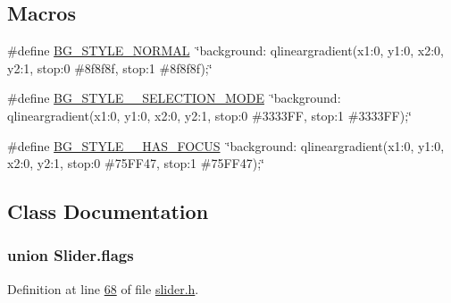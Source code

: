 \subsection*{Macros}
\begin{DoxyCompactItemize}
\item 
\#define \hyperlink{a00025_a0a9d6eabafd981a8b48b343249428077}{B\+G\+\_\+\+S\+T\+Y\+L\+E\+\_\+\+N\+O\+R\+M\+A\+L}~\char`\"{}background\+: qlineargradient(x1\+:0, y1\+:0, x2\+:0, y2\+:1, stop\+:0 \#8f8f8f, stop\+:1 \#8f8f8f);\char`\"{}
\item 
\#define \hyperlink{a00025_a0d978e946366d0eb299bb966cf8a52e9}{B\+G\+\_\+\+S\+T\+Y\+L\+E\+\_\+\+\_\+\+S\+E\+L\+E\+C\+T\+I\+O\+N\+\_\+\+M\+O\+D\+E}~\char`\"{}background\+: qlineargradient(x1\+:0, y1\+:0, x2\+:0, y2\+:1, stop\+:0 \#3333\+F\+F, stop\+:1 \#3333\+F\+F);\char`\"{}
\item 
\#define \hyperlink{a00025_a3b78c22b908aee9d7cda0ff6240570fd}{B\+G\+\_\+\+S\+T\+Y\+L\+E\+\_\+\+\_\+\+H\+A\+S\+\_\+\+F\+O\+C\+U\+S}~\char`\"{}background\+: qlineargradient(x1\+:0, y1\+:0, x2\+:0, y2\+:1, stop\+:0 \#75\+F\+F47, stop\+:1 \#75\+F\+F47);\char`\"{}
\end{DoxyCompactItemize}


\subsection{Class Documentation}
\label{d7/d12/a00126}
\hypertarget{a00025_d7/d12/a00126}{}
\subsubsection{union Slider.\+flags}


Definition at line \hyperlink{a00025_source_l00068}{68} of file \hyperlink{a00025_source}{slider.\+h}.




